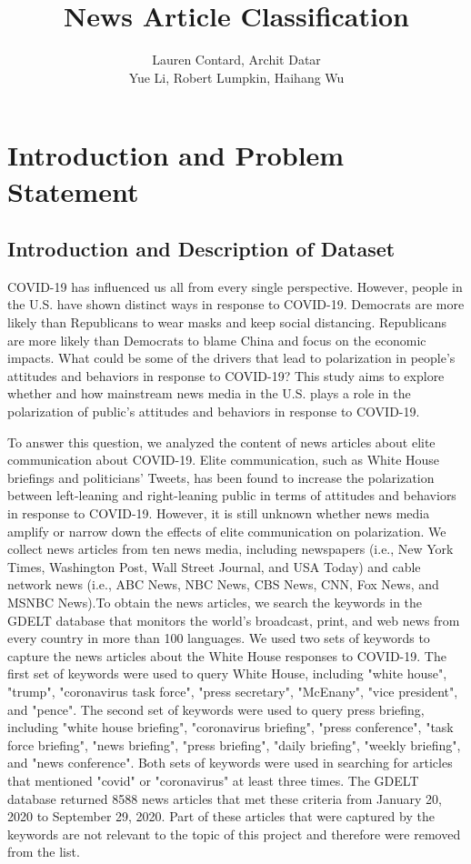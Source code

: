 \documentclass[11pt]{article}
\title{\Huge News Article Classification}
\author{Lauren Contard, Archit Datar \\ 
Yue Li, Robert Lumpkin, Haihang Wu}
\date{}
\begin{document}
\begin{singlespace}
    \maketitle
\end{singlespace}

\vspace{-3em}
\section{Introduction and Problem Statement}
\subsection{Introduction and Description of Dataset}

COVID-19 has influenced us all from every single perspective. However, people in the U.S. have shown distinct ways in response to COVID-19. Democrats are more likely than Republicans to wear masks and keep social distancing. Republicans are more likely than Democrats to blame China and focus on the economic impacts. What could be some of the drivers that lead to polarization in people's attitudes and behaviors in response to COVID-19? This study aims to explore whether and how mainstream news media in the U.S. plays a role in the polarization of public's attitudes and behaviors in response to COVID-19. 

To answer this question, we analyzed the content of news articles about elite communication about COVID-19. Elite communication, such as White House briefings and politicians' Tweets, has been found to increase the polarization between left-leaning and right-leaning public in terms of attitudes and behaviors in response to COVID-19. However, it is still unknown whether news media amplify or narrow down the effects of elite communication on polarization. We collect news articles from ten news media, including newspapers (i.e., New York Times, Washington Post, Wall Street Journal, and USA Today) and cable network news (i.e., ABC News, NBC News, CBS News, CNN, Fox News, and MSNBC News).To obtain the news articles, we search the keywords in the GDELT database that monitors the world's broadcast, print, and web news from every country in more than 100 languages. We used two sets of keywords to capture the news articles about the White House responses to COVID-19. The first set of keywords were used to query White House, including "white house", "trump", "coronavirus task force", "press secretary", "McEnany", "vice president", and "pence". The second set of keywords were used to query press briefing, including "white house briefing", "coronavirus briefing", "press conference", "task force briefing", "news briefing", "press briefing", "daily briefing", "weekly briefing", and "news conference". Both sets of keywords were used in searching for articles that mentioned "covid" or "coronavirus" at least three times. The GDELT database returned 8588 news articles that met these criteria from January 20, 2020 to September 29, 2020. Part of these articles that were captured by the keywords are not relevant to the topic of this project and therefore were removed from the list.
\end{document}
